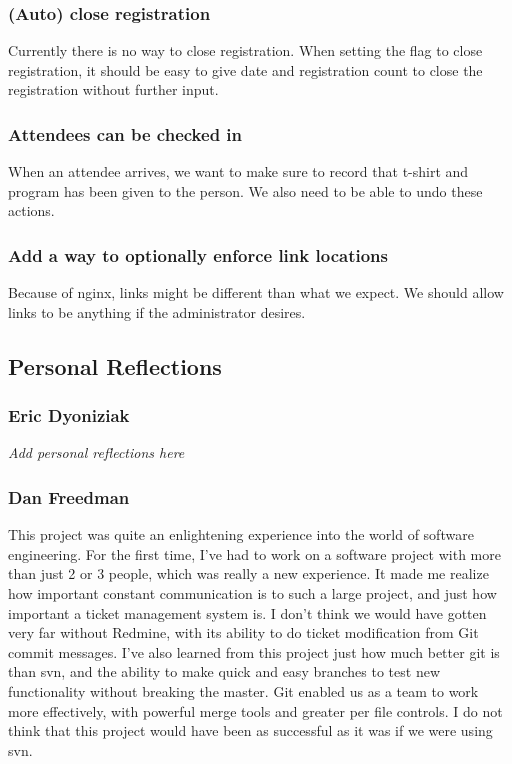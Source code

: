 \documentclass[12pt]{article}
\begin{document}
\subsubsection{(Auto) close registration}
Currently there is no way to close registration. When setting the flag to close
registration, it should be easy to give date and registration count to close
the registration without further input.
\subsubsection{Attendees can be checked in}
When an attendee arrives, we want to make sure to record that t-shirt and
program has been given to the person. We also need to be able to undo these
actions.
\subsubsection{Add a way to optionally enforce link locations}
Because of nginx, links might be different than what we expect. We should allow
links to be anything if the administrator desires.
\subsection{Personal Reflections}
\subsubsection{Eric Dyoniziak}
\textit{Add personal reflections here}
\subsubsection{Dan Freedman}
This project was quite an enlightening experience into the world of software engineering.
For the first time, I've had to work on a software project with more than just 2 or 3 people,
which was really a new experience. It made me realize how important constant communication
is to such a large project, and just how important a ticket management system is. I don't think
we would have gotten very far without Redmine, with its ability to do ticket modification from
Git commit messages. I've also learned from this project just how much better git is than svn,
and the ability to make quick and easy branches to test new functionality without breaking the master.
Git enabled us as a team to work more effectively, with powerful merge tools and greater per file controls.
I do not think that this project would have been as successful as it was if we were using svn.
\end{document}
